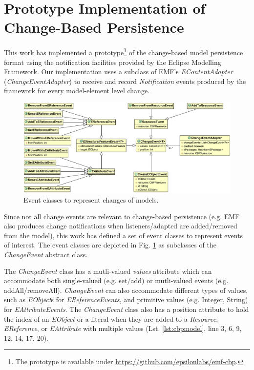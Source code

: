 \documentclass[12pt, a4paper]{report} \usepackage[titletoc]{appendix}
\begin{document}
\section{Prototype Implementation of Change-Based Persistence}
\label{prototype_implementation_of_change-based_persistence}
This work has implemented a prototype\footnote{The prototype is available under \url{https://github.com/epsilonlabs/emf-cbp}.} of the change-based model persistence format using the notification facilities provided by the Eclipse Modelling Framework. Our implementation uses a subclass of EMF's \emph{EContentAdapter} (\emph{ChangeEventAdapter}) to receive and record \emph{Notification} events produced by the framework for every model-element level change.

\begin{figure}[th]
	\centering
	\includegraphics[width=\linewidth]{events}
	\caption{Event classes to represent changes of models.}
	\label{fig:events}
\end{figure}

Since not all change events are relevant to change-based persistence (e.g. EMF also produces change notifications when listeners/adapted are added/removed from the model), this work has defined a set of event classes to represent events of interest. The event classes are depicted in Fig. \ref{fig:events} as subclasses of the \emph{ChangeEvent} abstract class. 

The \emph{ChangeEvent} class has a mutli-valued \emph{values} attribute which can accommodate both single-valued (e.g. set/add) or mutli-valued events (e.g. addAll/removeAll). \emph{ChangeEvent} can also accommodate different types of values, such as \emph{EObject}s for \emph{EReferenceEvents}, and primitive values (e.g. Integer, String) for \emph{EAttributeEvents}. The \emph{ChangeEvent} class also has a position attribute to hold the  index of an \emph{EObject} or a literal when they are added to a \emph{Resource}, \emph{EReference}, or \emph{EAttribute} with multiple values (Lst. \ref{lst:cbpmodel}, line 3, 6, 9, 12, 14, 17, 20). 
\end{document}
